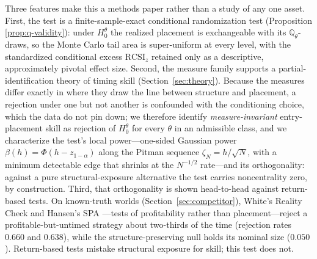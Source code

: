Three features make this a methods paper rather than a study of any one asset. First,
the test is a finite-sample-exact conditional randomization test (Proposition
\ref{prop:q-validity}): under $H_0^\theta$ the realized placement is exchangeable with
its $\mathbb{Q}_\theta$-draws, so the Monte Carlo tail area is super-uniform at every
level, with the standardized conditional excess $\mathrm{RCSI}_z$ retained only as a
descriptive, approximately pivotal effect size. Second, the measure family supports a
partial-identification theory of timing skill (Section~\ref{sec:theory}). Because the
measures differ exactly in where they draw the line between structure and placement, a
rejection under one but not another is confounded with the conditioning choice, which
the data do not pin down; we therefore identify \emph{measure-invariant} entry-placement
skill as rejection of $H_0^\theta$ for every $\theta$ in an admissible class, and we
characterize the test's local power---one-sided Gaussian power
$\beta(h)=\Phi(h-z_{1-\alpha})$ along the Pitman sequence $\zeta_N=h/\sqrt N$, with a
minimum detectable edge that shrinks at the $N^{-1/2}$ rate---and its orthogonality:
against a pure structural-exposure alternative the test carries noncentrality zero, by
construction. Third, that orthogonality is shown head-to-head against return-based
tests. On known-truth worlds (Section~\ref{sec:competitor}), White's Reality Check
\cite{white2000} and Hansen's SPA \cite{hansen2005}---tests of profitability rather than
placement---reject a profitable-but-untimed strategy about two-thirds of the time
(rejection rates $0.660$ and $0.638$), while the structure-preserving null holds its
nominal size ($0.050$). Return-based tests mistake structural exposure for skill; this
test does not.

